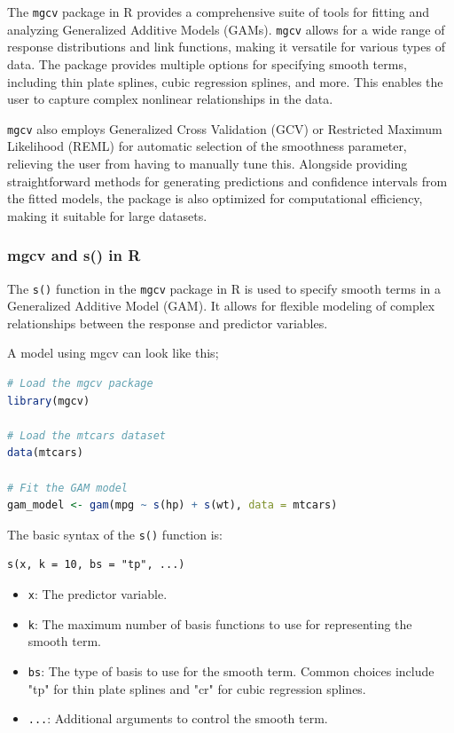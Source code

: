 \documentclass[12pt, twoside,hidelinks]{article}
\theoremstyle{definition}
\numberwithin{equation}{section}
\begin{document}
The \texttt{mgcv} package in R provides a comprehensive suite of tools for fitting and analyzing Generalized Additive Models (GAMs). 
\texttt{mgcv} allows for a wide range of response distributions and link functions, making it versatile for various types of data. 
The package provides multiple options for specifying smooth terms, including thin plate splines, cubic regression splines, and more. This enables the user to capture complex nonlinear relationships in the data.
\newline

\texttt{mgcv} also employs Generalized Cross Validation (GCV) or Restricted Maximum Likelihood (REML) for automatic selection of the smoothness parameter, relieving the user from having to manually tune this. 
Alongside providing straightforward methods for generating predictions and confidence intervals from the fitted models, the package is also optimized for computational efficiency, making it suitable for large datasets.



\subsubsection{mgcv and s() in R}

The \texttt{s()} function in the \texttt{mgcv} package in R is used to specify smooth terms in a Generalized Additive Model (GAM). It allows for flexible modeling of complex relationships between the response and predictor variables.


A model using mgcv can look like this;

\begin{lstlisting}[language=R]
# Load the mgcv package
library(mgcv)

# Load the mtcars dataset
data(mtcars)

# Fit the GAM model
gam_model <- gam(mpg ~ s(hp) + s(wt), data = mtcars)

\end{lstlisting}

The basic syntax of the \texttt{s()} function is:

\begin{verbatim}
s(x, k = 10, bs = "tp", ...)
\end{verbatim}

\begin{itemize}
  \item \texttt{x}: The predictor variable.
  \item \texttt{k}: The maximum number of basis functions to use for representing the smooth term.
  \item \texttt{bs}: The type of basis to use for the smooth term. Common choices include "tp" for thin plate splines and "cr" for cubic regression splines.
  \item \texttt{...}: Additional arguments to control the smooth term.
\end{itemize}
\end{document}

